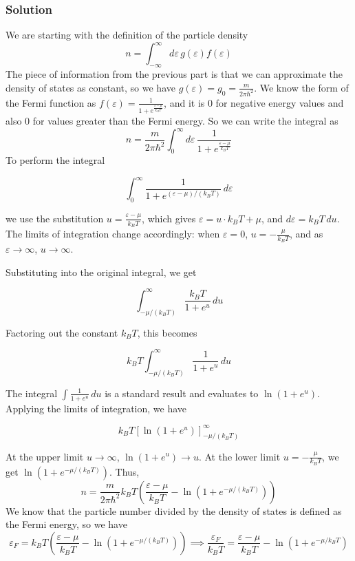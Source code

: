 \documentclass[12pt]{article}
\begin{document}
\subsubsection{Solution}
We are starting with the definition of the particle density
\begin{equation}
    n = \int_{-\infty}^{\infty} d \varepsilon \, g(\varepsilon) f(\varepsilon)
\end{equation}
The piece of information from the previous part is that we can approximate the density of states as constant, so we have \( g(\varepsilon) = g_0 = \frac{m}{2\pi \hbar^2} \). We know the form of the Fermi function as \( f(\varepsilon) = \frac{1}{1 + e^{\frac{\varepsilon - \mu}{k_B T}}} \), and it is 0 for negative energy values and also 0 for values greater than the Fermi energy. So we can write the integral as
\begin{equation}
    n = \frac{m}{2\pi \hbar^2}\int_{0}^{\infty} d \varepsilon \, \frac{1}{1 + e^{\frac{\varepsilon - \mu}{k_B T}}}
\end{equation}
To perform the integral

\[
\int_0^\infty \frac{1}{1 + e^{(\varepsilon - \mu) / (k_B T)}} \, d\varepsilon
\]

we use the substitution \( u = \frac{\varepsilon - \mu}{k_B T} \), which gives \( \varepsilon = u \cdot k_B T + \mu \), and \( d\varepsilon = k_B T \, du \). The limits of integration change accordingly: when \( \varepsilon = 0 \), \( u = -\frac{\mu}{k_B T} \), and as \( \varepsilon \to \infty \), \( u \to \infty \).

Substituting into the original integral, we get

\[
\int_{-\mu/(k_B T)}^{\infty} \frac{k_B T}{1 + e^u} \, du
\]

Factoring out the constant \( k_B T \), this becomes

\[
k_B T \int_{-\mu/(k_B T)}^{\infty} \frac{1}{1 + e^u} \, du
\]

The integral \( \int \frac{1}{1 + e^u} \, du \) is a standard result and evaluates to \( \ln(1 + e^u) \). Applying the limits of integration, we have

\[
k_B T \left[ \ln(1 + e^u) \right]_{-\mu/(k_B T)}^{\infty}
\]

At the upper limit \( u \to \infty \), \( \ln(1 + e^u) \to u \). At the lower limit \( u = -\frac{\mu}{k_B T} \), we get \( \ln(1 + e^{-\mu/(k_B T)}) \). Thus, 
\begin{equation}
    n = \frac{m}{2\pi \hbar^2} k_B T \left( \frac{\varepsilon - \mu}{k_B T} - \ln(1 + e^{-\mu/(k_B T)}) \right)
\end{equation}
We know that the particle number divided by the density of states is defined as the Fermi energy, so we have
\begin{equation}
    \varepsilon_F = k_B T \left( \frac{\varepsilon - \mu}{k_B T} - \ln(1 + e^{-\mu/(k_B T)}) \right) \implies \frac{\varepsilon_F}{k_B T} = \frac{\varepsilon - \mu}{k_B T} - \ln(1 + e^{-\mu / k_B T})
\end{equation}
\end{document}
